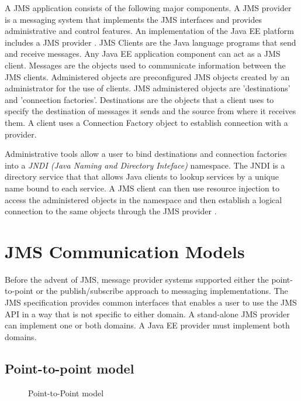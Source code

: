 \documentclass[9pt,twocolumn,twoside]{../../styles/osajnl}
\begin{document}
A JMS application consists of the following major components.  A JMS
provider is a messaging system that implements the JMS interfaces and
provides administrative and control features. An implementation of the
Java EE platform includes a JMS provider
\cite{www-jms-tutorialoracle}. JMS Clients are the Java language
programs that send and receive messages. Any Java EE application
component can act as a JMS client.  Messages are the objects used to
communicate information between the JMS clients.  Administered objects
are preconfigured JMS objects created by an administrator for the use
of clients.  JMS administered objects are 'destinations' and
'connection factories'. Destinations are the objects that a client uses
to specify the destination of messages it sends and the source from
where it receives them.  A client uses a Connection Factory object to
establish connection with a provider.

Administrative tools allow a user to bind destinations and connection
factories into a \emph{JNDI (Java Naming and Directory Inteface)}
\cite{www-jndi-wiki} namespace. The JNDI is a directory service that
that allows Java clients to lookup services by a unique name bound to
each service. A JMS client can then use resource injection to access
the administered objects in the namespace and then establish a logical
connection to the same objects through the JMS provider
\cite{www-jms-tutorialoracle}.


\section{JMS Communication Models}

Before the advent of JMS, message provider systems supported either
the point-to-point or the publish/subscribe approach to messaging
implementations. The JMS specification provides common interfaces that
enables a user to use the JMS API in a way that is not specific to
either domain. A stand-alone JMS provider can implement one or both
domains. A Java EE provider must implement both domains.

\subsection{Point-to-point model}

\begin{figure}[htbp]
\centering
{}
\caption{Point-to-Point model \cite{www-jms-tutorialoracle}}
\label{fig:Point-to-Point messaging}
\end{figure}
\end{document}
